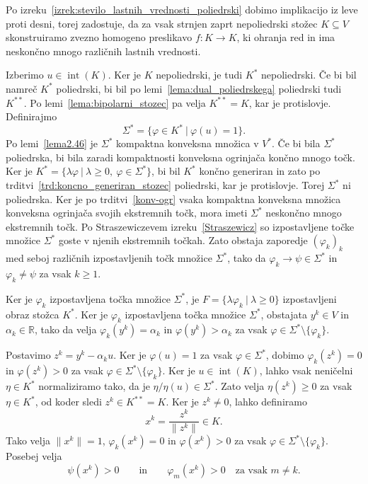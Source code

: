 \documentclass[mat2, tisk]{fmfdelo}
\begin{document}
\begin{dokaz}
Po izreku~\ref{izrek:stevilo_lastnih_vrednosti_poliedrski} dobimo 
implikacijo iz leve proti desni, torej zadostuje, da
za vsak strnjen zaprt nepoliedrski stožec $K\subseteq V$ skonstruiramo
zvezno homogeno preslikavo $f\colon K\longrightarrow K$, ki ohranja red
in ima neskončno mnogo različnih lastnih vrednosti.

Izberimo $u\in\operatorname{int}(K)$. Ker je $K$ nepoliedrski, je tudi $K^*$ nepoliedrski.
Če bi bil namreč $K^*$ poliedrski, bi bil po lemi~\ref{lema:dual_poliedrskega}
poliedrski tudi $K^{**}$. Po lemi~\ref{lema:bipolarni_stozec} pa velja
$K^{**}=K$, kar je protislovje. Definirajmo
\[
\Sigma^*=\{\varphi\in K^* ~|~ \varphi(u)=1\}.
\]
Po lemi~\ref{lema2.46} je $\Sigma^*$ kompaktna konveksna množica v
$V^*$. Če bi bila $\Sigma^*$ poliedrska, bi bila zaradi kompaktnosti
konveksna ogrinjača končno mnogo točk. Ker je
$K^*=\{\lambda\varphi ~|~ \lambda\geq0,\ \varphi\in\Sigma^*\}$, bi bil
$K^*$ končno generiran in zato po
trditvi~\ref{trd:koncno_generiran_stozec} poliedrski, kar je
protislovje. Torej $\Sigma^*$ ni poliedrska. Ker je po
trditvi~\ref{konv-ogr} vsaka kompaktna konveksna
množica konveksna ogrinjača svojih ekstremnih točk,
mora imeti $\Sigma^*$ neskončno mnogo ekstremnih točk. Po Straszewiczevem izreku~\ref{Straszewicz} so
izpostavljene točke množice $\Sigma^*$ goste v njenih ekstremnih
točkah. Zato obstaja zaporedje $(\varphi_k)_k$ med seboj različnih
izpostavljenih točk množice $\Sigma^*$, tako da
$\varphi_k\longrightarrow\psi\in\Sigma^*$ in $\varphi_k\neq\psi$ za
vsak $k\geq1$.

Ker je $\varphi_k$ izpostavljena točka množice $\Sigma^*$, je
$F=\{\lambda\varphi_k ~|~ \lambda\geq0\}$ izpostavljeni obraz stožca $K^*$.
Ker je $\varphi_k$ izpostavljena točka množice $\Sigma^*$,
obstajata $y^k\in V$ in $\alpha_k\in\mathbb{R}$, tako da velja
$\varphi_k(y^k)=\alpha_k$
in
$\varphi(y^k)>\alpha_k$
za vsak $\varphi\in\Sigma^*\setminus\{\varphi_k\}$.

Postavimo $z^k=y^k-\alpha_k u$.
Ker je $\varphi(u)=1$ za vsak $\varphi\in\Sigma^*$,
dobimo
$\varphi_k(z^k)=0$
in
$\varphi(z^k)>0$
za vsak $\varphi\in\Sigma^*\setminus\{\varphi_k\}$.
Ker je $u\in\operatorname{int}(K)$, lahko vsak neničelni
$\eta\in K^*$ normaliziramo tako, da je
$\eta/\eta(u)\in\Sigma^*$.
Zato velja $\eta(z^k)\geq0$ za vsak $\eta\in K^*$,
od koder sledi $z^k\in K^{**}=K$.
Ker je $z^k\neq0$, lahko definiramo
\[
x^k=\frac{z^k}{\|z^k\|}\in K.
\]
Tako velja $\|x^k\|=1$, $\varphi_k(x^k)=0$
in $\varphi(x^k)>0$ za vsak
$\varphi\in\Sigma^*\setminus\{\varphi_k\}$.
Posebej velja
\begin{equation}\label{eq:pozitivnost_funkcionalov}
\psi(x^k)>0
\qquad\text{in}\qquad
\varphi_m(x^k)>0\quad\text{za vsak }m\neq k.
\end{equation}


\end{dokaz}
\end{document}
